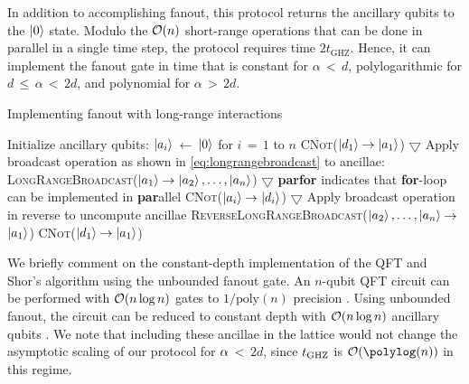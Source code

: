 In addition to accomplishing fanout, this protocol returns the ancillary qubits to the $\left | 0 \right\rangle$ state.
Modulo the $\O{n}$ short-range operations that can be done in parallel in a single time step, the protocol requires time $2 t_\mathrm{GHZ}$.
Hence, it can implement the fanout gate in time that is constant for $\alpha$\,$<$\,$d$, polylogarithmic for $d$\,$\le$\,$\alpha$\,$<$\,$2d$, and polynomial for $\alpha$\,$>$\,$2d$.

\begin{algorithm}[H]
  \caption{Implementing fanout with long-range interactions}
  \label{alg:fastfanout}
  \begin{algorithmic}[1]
   \State Initialize ancillary qubits: $\left | a_i \right\rangle$\,$\gets$\,$\left | 0 \right\rangle$ for $i$\,$=$\,$1$ to $n$
  \State \textsc{CNot}($\left | d_1 \right\rangle$\,$\rightarrow$\,$\left | a_1 \right\rangle$)
  \Statex $\bigtriangledown$ Apply broadcast operation as shown in \cref{eq:longrangebroadcast} to ancillae:
  \State \textsc{LongRangeBroadcast}($\left | a_1 \right\rangle$\,$\rightarrow$\,$\left | a_2 \right\rangle,\dots,\left | a_n \right\rangle$)
  \Statex $\bigtriangledown$ \textbf{parfor} indicates that \textbf{for}-loop can be implemented in \textbf{par}allel
    \State \textsc{CNot}($\left | a_i \right\rangle$\,$\rightarrow$\,$\left | d_{i} \right\rangle$)
  \EndParFor
  \Statex $\bigtriangledown$ Apply broadcast operation in reverse to uncompute ancillae
  \State \textsc{ReverseLongRangeBroadcast}($\left | a_2 \right\rangle,\dots,\left | a_n \right\rangle$\,$\rightarrow$\,$\left | a_1 \right\rangle$)
  \State \textsc{CNot}($\left | d_1 \right\rangle$\,$\rightarrow$\,$\left | a_1 \right\rangle$)
  \end{algorithmic}
\end{algorithm}

We briefly comment on the constant-depth implementation of the QFT and Shor's algorithm using the unbounded fanout gate.
An $n$-qubit QFT circuit can be performed with $\O{n\log n}$ gates to $1/\text{poly}(n)$ precision \cite{Coppersmith94}.
Using unbounded fanout, the circuit can be reduced to constant depth with $\O{n\log n}$ ancillary qubits \cite{Hoyer2005}.
We note that including these ancillae in the lattice would not change the asymptotic scaling of our protocol for $\alpha$\,$<$\,$2d$, since $t_{\text{GHZ}}$ is $\O{\polylog(n)}$ in this regime.

